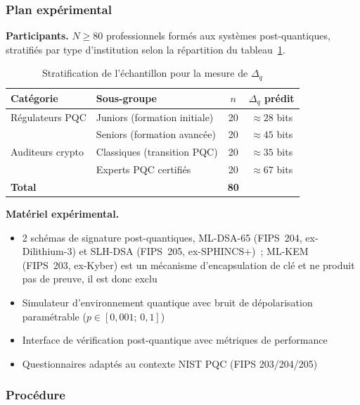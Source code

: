 \begin{sloppypar}
\subsubsection{Plan exp\'erimental}
\label{subsubsec:design_delta_q}

\noindent\textbf{Participants.} $N \geq 80$ professionnels form\'es aux
syst\`emes post-quantiques, stratifi\'es par type d'institution selon la
r\'epartition du tableau~\ref{tab:stratification_delta_q}.

\begin{table}[htbp]
\centering
\caption{Stratification de l'\'echantillon pour la mesure de $\Delta_q$}
\label{tab:stratification_delta_q}
\begin{tabular}{@{}llcc@{}}
\toprule
\textbf{Cat\'egorie} & \textbf{Sous-groupe} & \textbf{$n$} & \textbf{$\Delta_q$ pr\'edit} \\
\midrule
R\'egulateurs PQC & Juniors (formation initiale) & 20 & $\approx 28$ bits \\
                  & Seniors (formation avanc\'ee) & 20 & $\approx 45$ bits \\
\midrule
Auditeurs crypto & Classiques (transition PQC) & 20 & $\approx 35$ bits \\
                 & Experts PQC certifi\'es & 20 & $\approx 67$ bits \\
\midrule
\textbf{Total} & & \textbf{80} & \\
\bottomrule
\end{tabular}
\end{table}

\noindent\textbf{Mat\'eriel exp\'erimental.}
\begin{itemize}
\item 2 sch\'emas de signature post-quantiques, ML-DSA-65 (FIPS~204,
      ex-Dilithium-3) et SLH-DSA (FIPS~205, ex-SPHINCS+)~; ML-KEM (FIPS~203,
      ex-Kyber) est un m\'ecanisme d'encapsulation de cl\'e et ne produit pas de
      preuve, il est donc exclu
\item Simulateur d'environnement quantique avec bruit de d\'epolarisation
      param\'etrable ($p \in [0{,}001;\,0{,}1]$)
\item Interface de v\'erification post-quantique avec m\'etriques de performance
\item Questionnaires adapt\'es au contexte NIST PQC (FIPS 203/204/205)
\end{itemize}

\subsubsection{Proc\'edure}
\label{subsubsec:procedure_delta_q}


\end{sloppypar}
